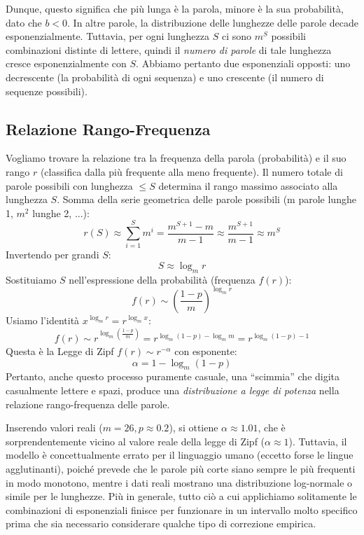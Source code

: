 Dunque, questo significa che più lunga è la parola, minore è la sua probabilità, dato che $b < 0$. In altre parole, la distribuzione delle lunghezze delle parole decade esponenzialmente. Tuttavia, per ogni lunghezza $S$ ci sono $m^S$ possibili combinazioni distinte di lettere, quindi il \textit{numero di parole} di tale lunghezza cresce esponenzialmente con $S$. Abbiamo pertanto due esponenziali opposti: uno decrescente (la probabilità di ogni sequenza) e uno crescente (il numero di sequenze possibili).

\subsection{Relazione Rango-Frequenza}
Vogliamo trovare la relazione tra la frequenza della parola (probabilità) e il suo rango $r$ (classifica dalla più frequente alla meno frequente).
Il numero totale di parole possibili con lunghezza $\le S$ determina il rango massimo associato alla lunghezza $S$.
Somma della serie geometrica delle parole possibili (m parole lunghe 1, $m^2$ lunghe 2, ...):
\begin{equation}
    r(S) \approx \sum_{i=1}^{S} m^i = \frac{m^{S+1}-m}{m-1} \approx \frac{m^{S+1}}{m-1} \approx m^S
\end{equation}
Invertendo per grandi $S$:
\begin{equation}
    S \approx \log_m r
\end{equation}
Sostituiamo $S$ nell'espressione della probabilità (frequenza $f(r)$):
\begin{equation}
    f(r) \sim \left( \frac{1-p}{m} \right)^{\log_m r}
\end{equation}
Usiamo l'identità $x^{\log_m r} = r^{\log_m x}$:
\begin{equation}
    f(r) \sim r^{\log_m \left( \frac{1-p}{m} \right)} = r^{\log_m(1-p) - \log_m m} = r^{\log_m(1-p) - 1}
\end{equation}
Questa è la Legge di Zipf $f(r) \sim r^{-\alpha}$ con esponente:
\begin{equation}
    \alpha = 1 - \log_m(1-p)
\end{equation}
Pertanto, anche questo processo puramente casuale, una ``scimmia'' che digita casualmente lettere e spazi, produce una \textit{distribuzione a legge di potenza} nella relazione rango-frequenza delle parole. 

Inserendo valori reali ($m=26, p \approx 0.2$), si ottiene $\alpha \approx 1.01$, che è sorprendentemente vicino al valore reale della legge di Zipf ($\alpha \approx 1$).
Tuttavia, il modello è concettualmente errato per il linguaggio umano (eccetto forse le lingue agglutinanti), poiché prevede che le parole più corte siano sempre le più frequenti in modo monotono, mentre i dati reali mostrano una distribuzione log-normale o simile per le lunghezze.
Più in generale, tutto ciò a cui applichiamo solitamente le combinazioni di esponenziali finisce per funzionare in un intervallo molto specifico prima che sia necessario considerare qualche tipo di correzione empirica.

